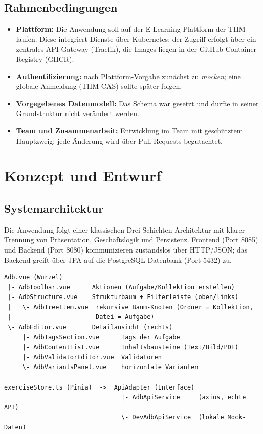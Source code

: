 \documentclass[11pt,a4paper]{article}
\begin{document}
\subsection{Rahmenbedingungen}
\begin{itemize}
  \item \textbf{Plattform:} Die Anwendung soll auf der E-Learning-Plattform der
  THM laufen. Diese integriert Dienste über Kubernetes; der Zugriff erfolgt über
  ein zentrales API-Gateway (Traefik), die Images liegen in der GitHub Container
  Registry (GHCR).
  \item \textbf{Authentifizierung:} nach Plattform-Vorgabe zunächst zu
  \emph{mocken}; eine globale Anmeldung (THM-CAS) sollte später folgen.
  \item \textbf{Vorgegebenes Datenmodell:} Das Schema war gesetzt und durfte in
  seiner Grundstruktur nicht verändert werden.
  \item \textbf{Team und Zusammenarbeit:} Entwicklung im Team mit geschütztem
  Hauptzweig; jede Änderung wird über Pull-Requests begutachtet.
\end{itemize}

\section{Konzept und Entwurf}\label{sec:konzept}

\subsection{Systemarchitektur}
Die Anwendung folgt einer klassischen Drei-Schichten-Architektur mit klarer
Trennung von Präsentation, Geschäftslogik und Persistenz. Frontend (Port 8085)
und Backend (Port 8080) kommunizieren zustandslos über HTTP/JSON; das Backend
greift über JPA auf die PostgreSQL-Datenbank (Port 5432) zu.

\begin{verbatim}
Adb.vue (Wurzel)
 |- AdbToolbar.vue      Aktionen (Aufgabe/Kollektion erstellen)
 |- AdbStructure.vue    Strukturbaum + Filterleiste (oben/links)
 |   \- AdbTreeItem.vue  rekursive Baum-Knoten (Ordner = Kollektion,
 |                       Datei = Aufgabe)
 \- AdbEditor.vue       Detailansicht (rechts)
     |- AdbTagsSection.vue      Tags der Aufgabe
     |- AdbContentList.vue      Inhaltsbausteine (Text/Bild/PDF)
     |- AdbValidatorEditor.vue  Validatoren
     \- AdbVariantsPanel.vue    horizontale Varianten

exerciseStore.ts (Pinia)  ->  ApiAdapter (Interface)
                                |- AdbApiService     (axios, echte API)
                                \- DevAdbApiService  (lokale Mock-Daten)
\end{verbatim}
\end{document}
